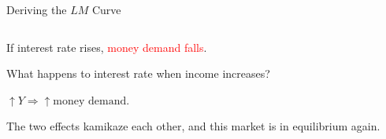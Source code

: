 \documentclass[shownotes,11pt, aspectratio=169]{beamer}
\newenvironment{wideitemize}{\itemize\addtolength{\itemsep}{10pt}}{\enditemize}
\begin{document}
\begin{frame}{Deriving the $LM$ Curve}
\begin{columns}[T] %
\begin{column}{.44\textwidth}
  \begin{wideitemize}
   \item If interest rate rises, \pause \textcolor{red}{money demand falls}. \pause
   \item What happens to interest rate when income increases? \pause 
   \item $\uparrow Y \Rightarrow \uparrow \text{money demand}$.
   \item The two effects kamikaze each other, and this market is in equilibrium again.
  \end{wideitemize}
\end{column}%
\pause
\hfill%
\begin{column}{.53\textwidth}
\end{column}%
\end{columns}
\end{frame}
\end{document}

